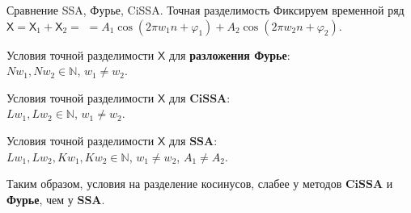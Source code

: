 \documentclass[notheorems, handout]{beamer}
\newcommand{\SSA}{\textbf{SSA}}
\newcommand{\CISSA}{\textbf{CiSSA}}
\newcommand{\TS}{\mathsf{X}}
\begin{document}
	\begin{frame}{Сравнение SSA, Фурье, CiSSA. Точная разделимость}
		Фиксируем временной ряд $\TS = \TS_{1} + \TS_{2} =$ $= A_1 \cos(2\pi w_1 n + \varphi_1) + A_2 \cos(2\pi w_2 n + \varphi_2)$.

		\bigskip
		Условия точной разделимости $\TS$ для \textbf{разложения Фурье}: \\
		$Nw_1, Nw_2 \in \mathbb{N}$, $w_1 \not = w_2$.

		\medskip
		Условия точной разделимости $\TS$ для $\CISSA$: \\
		$Lw_1, Lw_2 \in \mathbb{N}$, $w_1 \not = w_2$.
		
		\medskip
		Условия точной разделимости $\TS$ для $\SSA$: \\
		$Lw_1, Lw_2, Kw_1, Kw_2 \in \mathbb{N}$, $w_1 \not = w_2$, $A_1 \not = A_2$.

		\bigskip
		Таким образом, условия на разделение косинусов, слабее у методов $\CISSA$ и \textbf{Фурье}, чем у $\SSA$.
	\end{frame}
	
\end{document}
